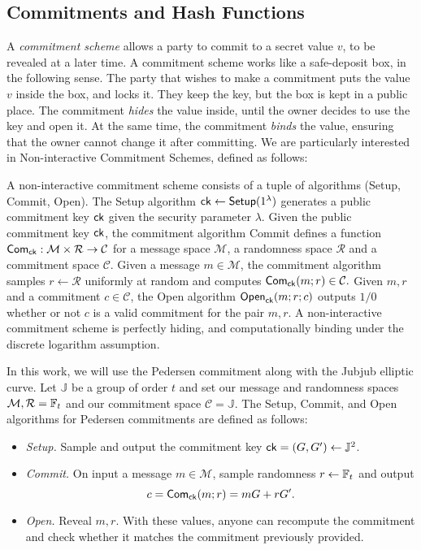\subsection{Commitments and Hash Functions}

A \emph{commitment scheme} allows a party to commit to a secret value $v$, to be revealed at a later time. A commitment scheme works like a safe-deposit box, in the following sense. The party that wishes to make a commitment puts the value $v$ inside the box, and locks it. They keep the key, but the box is kept in a public place. The commitment \emph{hides} the value inside, until the owner decides to use the key and open it. At the same time, the commitment \emph{binds} the value, ensuring that the owner cannot change it after committing. We are particularly interested in Non-interactive Commitment Schemes, defined as follows:

\begin{definition}
A non-interactive commitment scheme consists of a tuple of algorithms (Setup, Commit, Open). The Setup algorithm $\mathsf{ck} \leftarrow \mathsf{Setup}(1^\lambda)$ generates a public commitment key $\mathsf{ck}$ given the security parameter $\lambda$. Given the public commitment key $\mathsf{ck}$, the commitment algorithm Commit defines a function $\mathsf{Com}_{\mathsf{ck}} : \mathcal{M} \times \mathcal{R} \rightarrow \mathcal{C}$ for a message space $\mathcal{M}$, a randomness space $\mathcal{R}$ and a commitment space $\mathcal{C}$. Given a message $m \in \mathcal{M}$, the commitment algorithm samples $r \leftarrow \mathcal{R}$ uniformly at random and computes $\mathsf{Com}_{\mathsf{ck}}(m;r) \in \mathcal{C}.$ Given $m,r$ and a commitment $c \in \mathcal{C}$, the Open algorithm $\mathsf{Open}_{\mathsf{ck}}(m;r;c)$ outputs $1/0$ whether or not $c$ is a valid commitment for the pair $m,r$. A non-interactive commitment scheme is perfectly hiding, and computationally binding under the discrete logarithm assumption. 
\end{definition}

In this work, we will use the Pedersen commitment along with the Jubjub elliptic curve. Let $\mathbb{J}$ be a group of order $t$ and set our message and randomness spaces $\mathcal{M}, \mathcal{R} = \mathbb{F}_t$ and our commitment space $\mathcal{C} = \mathbb{J}$. The Setup, Commit, and Open algorithms for Pedersen commitments are defined as follows:
\begin{itemize}
      \item \emph{Setup.} Sample and output the commitment key $\mathsf{ck}= (G,G')\gets\mathbb{J}^2$.
    \item \emph{Commit.} On input a message $m \in \mathcal{M}$, sample randomness $r\gets\mathbb{F}_t$ and output
    \[c = \mathsf{Com}_{\mathsf{ck}}(m;r)=mG+rG'.\]
    \item \emph{Open.} Reveal $m,r$. With these values, anyone can recompute the commitment and check whether it matches the commitment previously provided.
\end{itemize}


